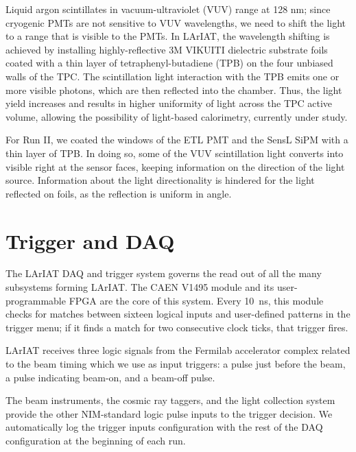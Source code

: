 Liquid argon scintillates in vacuum-ultraviolet (VUV) range at 128 nm; since cryogenic PMTs are not sensitive to VUV wavelengths, we need to shift the light to a range that is visible to the PMTs. In LArIAT, the wavelength shifting is achieved by installing highly-reflective 3M VIKUITI dielectric substrate foils coated with a thin layer of tetraphenyl-butadiene (TPB) on the four unbiased walls of the TPC. The scintillation light interaction with the TPB emits one or more visible photons, which are then reflected into the chamber. Thus, the light yield increases and results in higher uniformity of light across the TPC active volume, allowing the possibility of light-based calorimetry, currently under study.

For Run II, we coated   the windows of the ETL PMT and the SensL SiPM  with a thin layer of TPB. In doing so, some of the VUV scintillation light converts into visible right at the sensor faces, keeping information on the direction of the light source. Information about the light directionality is hindered for the light reflected on foils, as the reflection is uniform in angle. %



\section{Trigger and DAQ}
The LArIAT DAQ and trigger system governs the read out of all the many subsystems forming LArIAT. 
The CAEN V1495 module \cite{CAEN1495} and its user-programmable FPGA  are the core of this system.  Every 10~ns, this module checks for matches between sixteen logical inputs and user-defined patterns in the trigger menu; if it finds a match for two consecutive clock ticks, that trigger fires.

LArIAT receives three logic signals from the Fermilab accelerator complex related to the beam timing which we use as input triggers: a pulse just  before the beam, a pulse indicating beam-on, and a beam-off pulse.

The beam instruments,  the cosmic ray taggers, and the light collection system provide the other NIM-standard logic pulse inputs to the trigger decision. We automatically log the trigger inputs configuration with the rest of the DAQ configuration at the beginning of each run.

